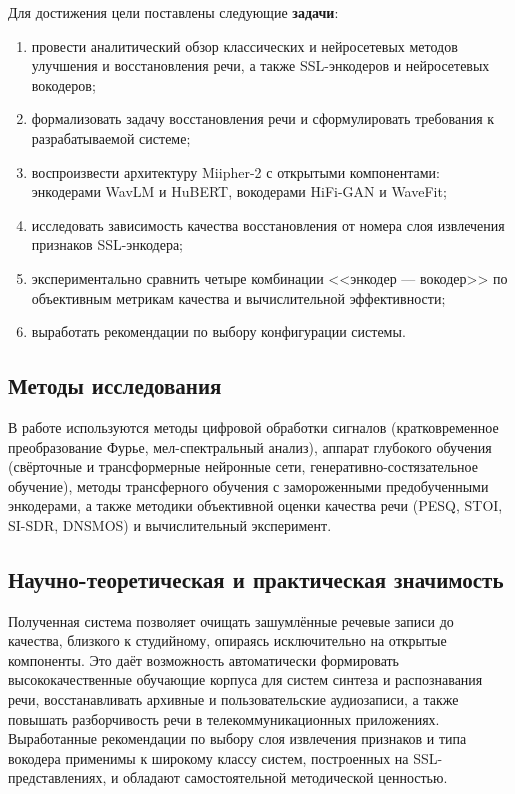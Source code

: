 Для достижения цели поставлены следующие \textbf{задачи}:
\begin{enumerate}
    \item провести аналитический обзор классических и нейросетевых методов
        улучшения и восстановления речи, а также SSL-энкодеров и нейросетевых
        вокодеров;
    \item формализовать задачу восстановления речи и сформулировать требования
        к разрабатываемой системе;
    \item воспроизвести архитектуру Miipher-2 с открытыми компонентами:
        энкодерами WavLM и HuBERT, вокодерами HiFi-GAN и WaveFit;
    \item исследовать зависимость качества восстановления от номера слоя
        извлечения признаков SSL-энкодера;
    \item экспериментально сравнить четыре комбинации <<энкодер — вокодер>> по
        объективным метрикам качества и вычислительной эффективности;
    \item выработать рекомендации по выбору конфигурации системы.
\end{enumerate}

\subsection{Методы исследования}

В работе используются методы цифровой обработки сигналов (кратковременное
преобразование Фурье, мел-спектральный анализ), аппарат глубокого обучения
(свёрточные и трансформерные нейронные сети, генеративно-состязательное
обучение), методы трансферного обучения с замороженными предобученными
энкодерами, а также методики объективной оценки качества речи (PESQ, STOI,
SI-SDR, DNSMOS) и вычислительный эксперимент.

\subsection{Научно-теоретическая и практическая значимость}

Полученная система позволяет очищать зашумлённые речевые записи до качества,
близкого к студийному, опираясь исключительно на открытые компоненты. Это даёт
возможность автоматически формировать высококачественные обучающие корпуса для
систем синтеза и распознавания речи, восстанавливать архивные и пользовательские
аудиозаписи, а также повышать разборчивость речи в телекоммуникационных
приложениях. Выработанные рекомендации по выбору слоя извлечения признаков и
типа вокодера применимы к широкому классу систем, построенных на
SSL-представлениях, и обладают самостоятельной методической ценностью.

